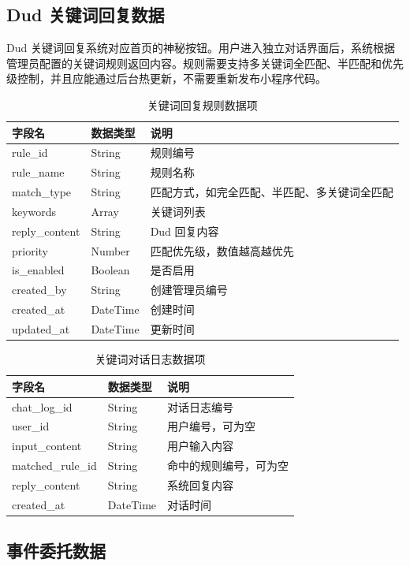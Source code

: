\documentclass[a4paper,12pt]{article}
\begin{document}
\subsection{Dud 关键词回复数据}

Dud 关键词回复系统对应首页的神秘按钮。用户进入独立对话界面后，系统根据管理员配置的关键词规则返回内容。规则需要支持多关键词全匹配、半匹配和优先级控制，并且应能通过后台热更新，不需要重新发布小程序代码。

\begin{longtable}{p{3.5cm}p{3cm}p{7cm}}
\caption{关键词回复规则数据项} \\
\toprule
字段名 & 数据类型 & 说明 \\
\midrule
rule\_id & String & 规则编号 \\
rule\_name & String & 规则名称 \\
match\_type & String & 匹配方式，如完全匹配、半匹配、多关键词全匹配 \\
keywords & Array & 关键词列表 \\
reply\_content & String & Dud 回复内容 \\
priority & Number & 匹配优先级，数值越高越优先 \\
is\_enabled & Boolean & 是否启用 \\
created\_by & String & 创建管理员编号 \\
created\_at & DateTime & 创建时间 \\
updated\_at & DateTime & 更新时间 \\
\bottomrule
\end{longtable}

\begin{longtable}{p{3.5cm}p{3cm}p{7cm}}
\caption{关键词对话日志数据项} \\
\toprule
字段名 & 数据类型 & 说明 \\
\midrule
chat\_log\_id & String & 对话日志编号 \\
user\_id & String & 用户编号，可为空 \\
input\_content & String & 用户输入内容 \\
matched\_rule\_id & String & 命中的规则编号，可为空 \\
reply\_content & String & 系统回复内容 \\
created\_at & DateTime & 对话时间 \\
\bottomrule
\end{longtable}

\subsection{事件委托数据}
\end{document}
